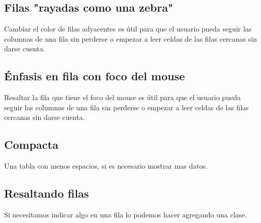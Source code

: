 \documentclass[letterpaper,10pt,spanish]{sphinxmanual}
\begin{document}
\subsection{Filas "rayadas como una zebra"}
\label{\detokenize{hay-tabla:filas-rayadas-como-una-zebra}}
Cambiar el color de filas adyacentes es útil para que el usuario pueda seguir
las columnas de una fila sin perderse o empezar a leer celdas de las filas
cercanas sin darse cuenta.

%
\begin{sphinxVerbatim}[commandchars=\\\{\}]
 
\end{sphinxVerbatim}




\subsection{Énfasis en fila con foco del mouse}
\label{\detokenize{hay-tabla:enfasis-en-fila-con-foco-del-mouse}}
Resaltar la fila que tiene el foco del mouse es útil para que el usuario pueda
seguir las columnas de una fila sin perderse o empezar a leer celdas de las
filas cercanas sin darse cuenta.

%
\begin{sphinxVerbatim}[commandchars=\\\{\}]
 
\end{sphinxVerbatim}




\subsection{Compacta}
\label{\detokenize{hay-tabla:compacta}}
Una tabla con menos espacios, si es necesario mostrar mas datos.

%
\begin{sphinxVerbatim}[commandchars=\\\{\}]
 
\end{sphinxVerbatim}




\subsection{Resaltando filas}
\label{\detokenize{hay-tabla:resaltando-filas}}
Si necesitamos indicar algo en una fila lo podemos hacer agregando una clase.
\end{document}
